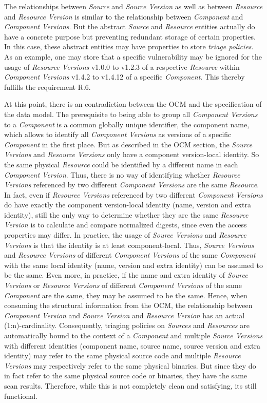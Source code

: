 The relationships between \emph{Source} and \emph{Source Version} as well as between \emph{Resource} and \emph{Resource Version} is similar to the relationship between \emph{Component} and \emph{Component Versions}. But the abstract \emph{Source} and \emph{Resource} entities actually do have a concrete purpose but preventing redundant storage of certain properties. In this case, these abstract entities may have properties to store \emph{triage policies}. As an example, one may store that a specific vulnerability may be ignored for the usage of \emph{Resource Versions} v1.0.0 to v1.2.3 of a respective \emph{Resource} within \emph{Component Versions} v1.4.2 to v1.4.12 of a specific \emph{Component}. This thereby fulfills the requirement R.6.\par 
At this point, there is an contradiction between the OCM and the specification of the data model. The prerequisite to being able to group all \emph{Component Versions} to a \emph{Component} is a common globally unique identifier, the component name, which allows to identify all \emph{Component Versions} as versions of a specific \emph{Component} in the first place. But as described in the OCM section, the \emph{Source Versions} and \emph{Resource Versions} only have a component version-local identity. So the same physical \emph{Resource} could be identified by a different name in each \emph{Component Version}. Thus, there is no way of identifying whether \emph{Resource Versions} referenced by two different \emph{Component Versions} are the same \emph{Resource}. In fact, even if \emph{Resource Versions} referenced by two different \emph{Component Versions} do have exactly the component version-local identity (name, version and extra identity), still the only way to determine whether they are the same \emph{Resource Version} is to calculate and compare normalized digests, since even the access properties may differ. In practice, the usage of \emph{Source Versions} and \emph{Resource Versions} is that the identity is at least component-local. Thus, \emph{Source Versions} and \emph{Resource Versions} of different \emph{Component Versions} of the same \emph{Component} with the same local identity (name, version and extra identity) can be assumed to be the same. Even more, in practice, if the name and extra identity of \emph{Source Versions} or \emph{Resource Versions} of different \emph{Component Versions} of the same \emph{Component} are the same, they may be assumed to be the same. Hence, when consuming the structural information from the OCM, the relationship between \emph{Component Version} and \emph{Source Version} and \emph{Resource Version} has an actual (1:n)-cardinality. Consequently, triaging policies on \emph{Sources} and \emph{Resources} are automatically bound to the context of a \emph{Component} and multiple \emph{Source Versions} with different identities (component name, source name, source version and extra identity) may refer to the same physical source code and multiple \emph{Resource Versions} may respectively refer to the same physical binaries. But since they do in fact refer to the same physical source code or binaries, they have the same scan results. Therefore, while this is not completely clean and satisfying, its still functional.\par 
